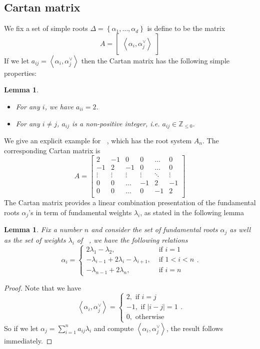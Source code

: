 \documentclass[12pt]{article} %
\newtheorem{lemma}[definition]{Lemma}
\DeclareMathOperator{\SLn}{\text{SL}_n(\mathbb{R})}
\DeclareMathOperator{\slnr}{\mathfrak{sl}_n(\mathbb{R})}
\begin{document}
\subsection{Cartan matrix}
We fix a set of simple roots $\Delta = \left\lbrace \alpha_1,\ldots,\alpha_d \right\rbrace$ is define to be the matrix
\[A = \begin{bmatrix} \left\langle \alpha_i,\alpha_j^\vee  \right\rangle
    \end{bmatrix}\]
If we let $a_{ij}=  \left\langle \alpha_i,\alpha_j^\vee\right\rangle$ then the Cartan matrix has the following simple properties:
\begin{lemma}
    \hfill
    \begin{itemize}
        \item For any $i$, we have $a_{ii}=2$.
        \item For any $i \ne j$, $a_{ij}$ is a non-positive integer, i.e. $a_{ij} \in \mathbb{Z}_{\le 0}$.
    \end{itemize}
\end{lemma}
We give an explicit example for $\slnr$, which has the root system $A_n$. The corresponding Cartan matrix is
\[A = \begin{bmatrix}
        2      & -1     & 0      & 0      & \ldots & 0      \\
        -1     & 2      & -1     & 0      & \ldots & 0      \\
        \vdots & \vdots & \vdots & \vdots & \ddots & \vdots \\
        0      & 0      & \ldots & -1     & 2      & -1     \\
        0      & 0      & \ldots & 0      & -1     & 2      \\
    \end{bmatrix}\]
The Cartan matrix provides a linear combination presentation of the fundamental roots $\alpha_j$'s in term of fundamental weights $\lambda_i$,
as stated in the following lemma
\begin{lemma}\label{weight-root-comb}
    Fix a number $n$ and consider the set of fundamental roots $\alpha_j$ as well as the set of weights $\lambda_i$ of $\SLn$, we have the following relations
    \[\alpha_i = \begin{cases}
            2\lambda_1-\lambda_2,                    & \mbox{ if } i = 1 \\
            -\lambda_{i-1}+2\lambda_i-\lambda_{i+1}, & \mbox{ if } 1<i<n \\
            -\lambda_{n-1}+2\lambda_n,               & \mbox{ if } i =n
        \end{cases}.\]
\end{lemma}
\begin{proof}
    Note that we have
    \[\left\langle \alpha_i,\alpha_j^{\vee}\right\rangle = \begin{cases}
            2, \mbox{ if } i =j     \\
            -1, \mbox{ if } |i-j|=1 \\
            0, \mbox{ otherwise }
        \end{cases}. \]
    So if we let $\alpha_j = \sum_{i=1}^n a_{ij}\lambda_i$ and compute $\left\langle \alpha_i,\alpha_j^{\vee}\right\rangle$, the result follows immediately.
\end{proof}
\end{document}

